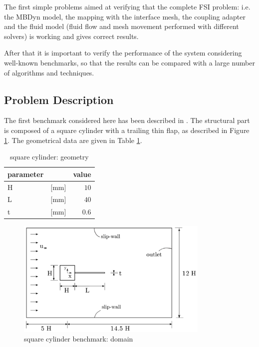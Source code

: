 The first simple problems aimed at verifying that the complete FSI problem: i.e. the MBDyn model, the mapping with the interface mesh, the coupling adapter and the fluid model (fluid flow and mesh movement performed with different solvers) is working and gives correct results.

After that it is important to verify the performance of the system considering well-known benchmarks, so that the results can be compared with a large number of algorithms and techniques.

\subsection{Problem Description}

The first benchmark considered here has been described in \cite{ramm1998fluid}. The structural part is composed of a square cylinder with a trailing thin flap, as described in Figure \ref{fig:sq_domain}. The geometrical data are given in Table \ref{table:sq-geom}.

\begin{table}[!htb]
	\begin{center}
		\begin{tabular}{ l c | r } 
			parameter & & value   \\ 
			\hline
			H  & [\si{mm}] & $10$     \\
			L & [\si{mm}] & $40$  \\
			t  & [\si{mm}] & $0.6$  \\			
		\end{tabular}
	\end{center}
	\caption{square cylinder: geometry}
	\label{table:sq-geom}
\end{table}

\begin{figure}[htbp!]
	\centering
	\includegraphics[width=0.82\textwidth, trim=0 0 0 0, clip]{images/sq-cyl/sq-cyl-domain.png}
	\caption{square cylinder benchmark: domain}
	\label{fig:sq_domain}
\end{figure}

